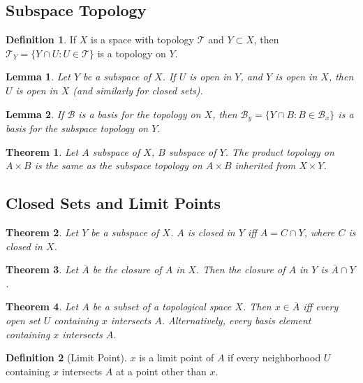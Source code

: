 \documentclass[8pt,reqno,twocolumn]{amsart}
\newtheorem*{theorem*}{Theorem}
\newtheorem*{lemma}{Lemma}
\theoremstyle{definition}
\newtheorem*{definition}{Definition}
\renewcommand{\tt}{\mathcal{T}}
\newcommand{\bb}{\mathcal{B}}
\begin{document}
\subsection*{Subspace Topology}
\begin{definition}
    If $X$ is a space with topology $\tt$ and $Y \subset X$, then $\tt_Y = \{Y \cap U : U \in \tt\}$ is a topology on $Y$.
\end{definition}
\begin{lemma}
    Let $Y$ be a subspace of $X$. If $U$ is open in $Y$, and $Y$ is open in $X$, then $U$ is open in $X$ (and similarly for closed sets).
\end{lemma}
\begin{lemma}
    If $\bb$ is a basis for the topology on $X$, then $\bb_y = \{Y \cap B : B \in \bb_x\}$ is a basis for the subspace topology on $Y$.
\end{lemma}
\begin{theorem*}
    Let $A$ subspace of $X$, $B$ subspace of $Y$. The product topology on $A \times B$ is the same as the subspace topology on $A \times B$ inherited from $X \times Y$.
\end{theorem*}
\subsection*{Closed Sets and Limit Points}
\begin{theorem*}
    Let $Y$ be a subspace of $X$. $A$ is closed in $Y$ iff $A = C \cap Y$, where $C$ is closed in $X$.
\end{theorem*}
\begin{theorem*}
    Let $\overline{A}$ be the closure of $A$ in $X$. Then the closure of $A$ in $Y$ is $\overline{A} \cap Y$.
\end{theorem*}
\begin{theorem*}
    Let $A$ be a subset of a topological space $X$. Then $x \in \overline{A}$ iff every open set $U$ containing $x$ intersects $A$. Alternatively, every basis element containing $x$ intersects $A$. 
\end{theorem*}
\begin{definition}[Limit Point]
    $x$ is a limit point of $A$ if every neighborhood $U$ containing $x$ intersects $A$ at a point other than $x$.
\end{definition}
\end{document}
